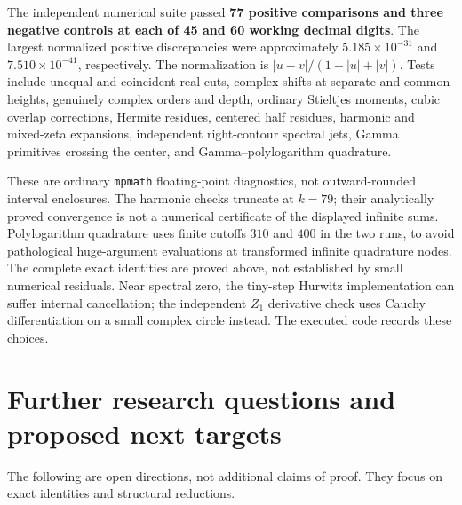 \documentclass[11pt,letterpaper]{article}
\theoremstyle{definition}\newtheorem{definition}[theorem]{Definition}
\theoremstyle{remark}\newtheorem{remark}[theorem]{Remark}
\begin{document}
The independent numerical suite passed \textbf{77 positive comparisons
and three negative controls at each of 45 and 60 working decimal digits}.
The largest normalized positive discrepancies were approximately
$5.185\times10^{-31}$ and $7.510\times10^{-41}$, respectively.
The normalization is $|u-v|/(1+|u|+|v|)$.
Tests include unequal and coincident real cuts, complex shifts at
separate and common heights, genuinely complex orders and depth,
ordinary Stieltjes moments, cubic overlap corrections, Hermite residues,
centered half residues, harmonic and mixed-zeta expansions, independent
right-contour spectral jets, Gamma primitives crossing the center, and
Gamma--polylogarithm quadrature.

These are ordinary \texttt{mpmath} floating-point diagnostics, not
outward-rounded interval enclosures. The harmonic checks truncate
at $k=79$; their analytically proved convergence is not a numerical
certificate of the displayed infinite sums. Polylogarithm quadrature
uses finite cutoffs $310$ and $400$ in the two runs, to avoid pathological
huge-argument evaluations at transformed infinite quadrature nodes.
The complete exact identities are proved above, not established by
small numerical residuals. Near spectral zero, the tiny-step Hurwitz
implementation can suffer internal cancellation; the independent
$Z_1$ derivative check uses Cauchy differentiation on a small complex
circle instead. The executed code records these choices.

\section{Further research questions and proposed next targets}
\label{mr:sec:future}
The following are open directions, not additional claims of proof.
They focus on exact identities and structural reductions.
\end{document}
